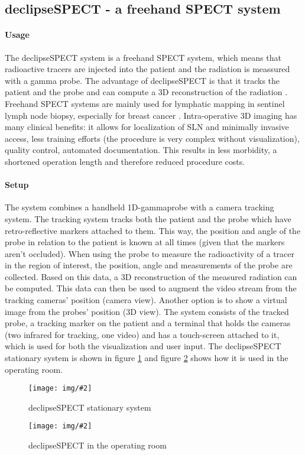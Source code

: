 \documentclass{scrartcl}
\newcommand{\graphic}[3][width=\linewidth] %
{
  \begin{figure}[h!t]
    \centering
    \texttt{[image: img/\#2]}
    \caption{#3}
    \label{fig:#2}
  \end{figure}
}
\newcommand{\refFigure}[1]{figure \ref{fig:#1}}
\begin{document}
\subsection{declipseSPECT - a freehand SPECT system}
\paragraph*{Usage}
The declipseSPECT system is a freehand SPECT system, which means that radioactive tracers are injected into the patient and the radiation is meassured with a gamma probe. The advantage of declipseSPECT is that it tracks the patient and the probe and can compute a 3D reconstruction of the radiation \cite{wendler}.
Freehand SPECT systems are mainly used for lymphatic mapping in sentinel lymph node biopsy, especially for breast cancer \cite{buck}. Intra-operative 3D imaging has many clinical benefits: it allows for localization of SLN and minimally invasive access, less training efforts (the procedure is very complex without visualization), quality control, automated documentation. This results in less morbidity, a shortened operation length and therefore reduced procedure costs.
\paragraph*{Setup}
The system combines a handheld 1D-gammaprobe with a camera tracking system. The tracking system tracks both the patient and the probe which have retro-reflective markers attached to them. This way, the position and angle of the probe in relation to the patient is known at all times (given that the markers aren't occluded). When using the probe to measure the radioactivity of a tracer in the region of interest, the position, angle and measurements of the probe are collected. Based on this data, a 3D reconstruction of the measured radiation can be computed.
This data can then be used to augment the video stream from the tracking cameras' position (camera view). Another option is to show a virtual image from the probes' position (3D view).
The system consists of the tracked probe, a tracking marker on the patient and a terminal that holds the cameras (two infrared for tracking, one video) and has a touch-screen attached to it, which is used for both the visualization and user input. The declipseSPECT stationary system is shown in \refFigure{declipseSPECT} and \refFigure{declipseSPECT-OR} shows how it is used in the operating room.
\graphic[scale=.7]{declipseSPECT}{declipseSPECT stationary system}
\graphic[scale=.7]{declipseSPECT-OR}{declipseSPECT in the operating room}
\end{document}
